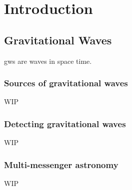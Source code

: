 \chapter{Introduction}
\label{chap:intro}
\chaptoc{}


\newpage
\section{Gravitational Waves}
\label{sec:gw}
\begin{colsection}


\begin{colsection}

\glspl{gw} are waves in space time.

\end{colsection}


\subsection{Sources of gravitational waves}
\label{sec:gw_sources}
\begin{colsection}

WIP

\end{colsection}


\subsection{Detecting gravitational waves}
\label{sec:gw_detecting}
\begin{colsection}

WIP

\end{colsection}


\subsection{Multi-messenger astronomy}
\label{sec:multimessenger}
\begin{colsection}

WIP

\end{colsection}


\end{colsection}

